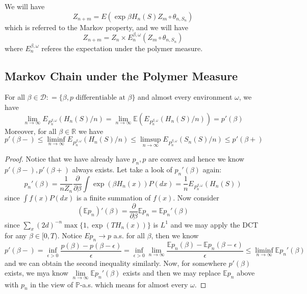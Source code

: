 \begin{proposition}
    We will have
    \[
    Z_{n+m} = E(\exp{\beta H_n(S)}Z_m\circ \theta_{n,S_n})
    \]
    which is referred to the Markov property, and we will have
    \[
    Z_{n+m} = Z_n \times E_{n}^{\beta,\omega}(Z_m \circ \theta_{n,S_n})
    \]
    where $E_n^{\beta,\omega}$ referes the expectation under the polymer measure.
\end{proposition}

\subsection{Markov Chain under the Polymer Measure}

\begin{proposition}
    For all $\beta \in \mathcal{D} : = \{\beta, p\text{ differentiable at }\beta\}$ and almost every environment $\omega$, we have
    \[
    \lim_{n\to\infty}E_{P^{\beta,\omega}_n}(H_n(S)/n) = \lim_{n\to\infty} \mathbb{E}(E_{P_n^{\beta,\omega}}(H_n(S)/n)) = p'(\beta)
    \]
    Moreover, for all $\beta \in \mathbb{R}$ we have
    \[
    p'(\beta - ) \leq \liminf\limits_{n\to\infty}E_{P^{\beta,\omega}_n}(H_n(S)/n) \leq \limsup\limits_{n\to\infty} E_{P^{\beta,\omega}_n} (S_n(S)/n) \leq p'(\beta +)
    \]
\end{proposition}
\begin{proof}
    Notice that we have already have $p_n,p$ are convex and hence we know $p'(\beta-),p'(\beta +)$ always exists. Let take a look of $p_n'(\beta)$ again:
    \[
    p_n'(\beta) = \dfrac{1}{nZ_n} \dfrac{\partial}{\partial \beta} \int \exp{(\beta H_n(x))} P(dx) = \dfrac{1}{n}E_{P^{\beta,\omega}_n}(H_n(S))
    \]
    since $\int f(x)P(dx)$ is a finite summation of $f(x)$. Now consider
    \[
    (\mathbb{E}p_n)'(\beta) = \dfrac{\partial}{\partial \beta} \mathbb{E} p_n = \mathbb{E} p_n'(\beta)
    \]
    since $\sum_{x}(2d)^{-n}\max\{1,\exp{(T H_n(x))}\}$ is $L^1$ and we may apply the DCT for any $\beta \in [0,T)$. Notice $Ep_n \to p$ a.s. for all $\beta$, then we know
    \[
    p'(\beta-) = \inf_{\epsilon > 0}\dfrac{p(\beta) - p(\beta-\epsilon)}{\epsilon} = \inf_{\epsilon > 0} \lim\limits_{n\to\infty} \dfrac{\mathbb{E}p_n(\beta)-\mathbb{E}p_n(\beta-\epsilon)}{\epsilon} \leq \liminf_{n\to\infty}\mathbb{E}p_n'(\beta)
    \]
    and we can obtain the second inequality similarly. Now, for somewhere $p'(\beta)$ exists, we mya know $\lim\limits_{n\to\infty} \mathbb{E}p_n'(\beta)$ exists and then we may replace $\mathbb{E}p_n$ above with $p_n$ in the view of $\mathbb{P}$-a.s. which means for almost every $\omega$.
\end{proof}

